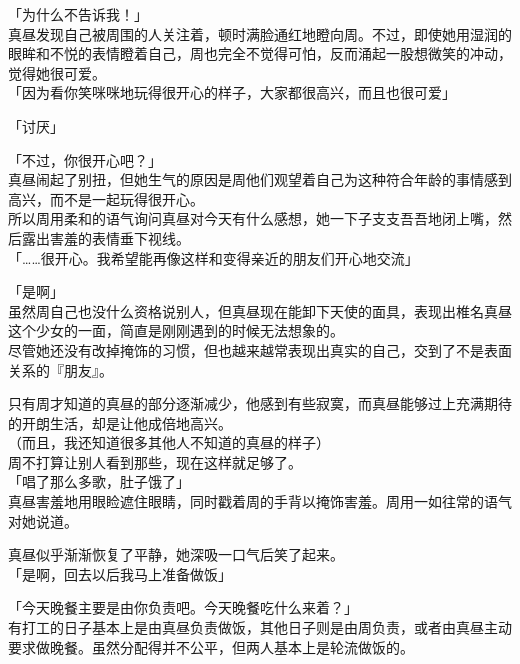 「为什么不告诉我！」\\

真昼发现自己被周围的人关注着，顿时满脸通红地瞪向周。不过，即使她用湿润的眼眸和不悦的表情瞪着自己，周也完全不觉得可怕，反而涌起一股想微笑的冲动，觉得她很可爱。\\

「因为看你笑咪咪地玩得很开心的样子，大家都很高兴，而且也很可爱」

「讨厌」

「不过，你很开心吧？」\\

真昼闹起了别扭，但她生气的原因是周他们观望着自己为这种符合年龄的事情感到高兴，而不是一起玩得很开心。\\

所以周用柔和的语气询问真昼对今天有什么感想，她一下子支支吾吾地闭上嘴，然后露出害羞的表情垂下视线。\\

「……很开心。我希望能再像这样和变得亲近的朋友们开心地交流」

「是啊」\\

虽然周自己也没什么资格说别人，但真昼现在能卸下天使的面具，表现出椎名真昼这个少女的一面，简直是刚刚遇到的时候无法想象的。\\

尽管她还没有改掉掩饰的习惯，但也越来越常表现出真实的自己，交到了不是表面关系的『朋友』。

只有周才知道的真昼的部分逐渐减少，他感到有些寂寞，而真昼能够过上充满期待的开朗生活，却是让他成倍地高兴。\\

（而且，我还知道很多其他人不知道的真昼的样子）\\

周不打算让别人看到那些，现在这样就足够了。\\

「唱了那么多歌，肚子饿了」\\

真昼害羞地用眼睑遮住眼睛，同时戳着周的手背以掩饰害羞。周用一如往常的语气对她说道。

真昼似乎渐渐恢复了平静，她深吸一口气后笑了起来。\\

「是啊，回去以后我马上准备做饭」

「今天晚餐主要是由你负责吧。今天晚餐吃什么来着？」\\

有打工的日子基本上是由真昼负责做饭，其他日子则是由周负责，或者由真昼主动要求做晚餐。虽然分配得并不公平，但两人基本上是轮流做饭的。

